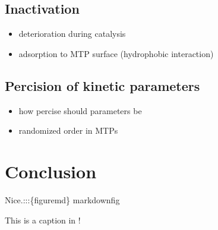 \documentclass[letterpaper,10pt,english]{jupyterBook}
\begin{document}
\section{Inactivation}
\label{\detokenize{discussion:inactivation}}\begin{itemize}
\item {} 
\sphinxAtStartPar
deterioration during catalysis

\item {} 
\sphinxAtStartPar
adsorption to MTP surface (hydrophobic interaction)

\end{itemize}


\section{Percision of kinetic parameters}
\label{\detokenize{discussion:percision-of-kinetic-parameters}}\begin{itemize}
\item {} 
\sphinxAtStartPar
how percise should parameters be

\item {} 
\sphinxAtStartPar
randomized order in MTPs

\end{itemize}

\sphinxstepscope


\chapter{Conclusion}
\label{\detokenize{conclusion:conclusion}}\label{\detokenize{conclusion::doc}}
\sphinxAtStartPar
Nice.:::\{figure\sphinxhyphen{}md\} markdown\sphinxhyphen{}fig


\sphinxAtStartPar
This is a caption in !

\sphinxstepscope
\end{document}
